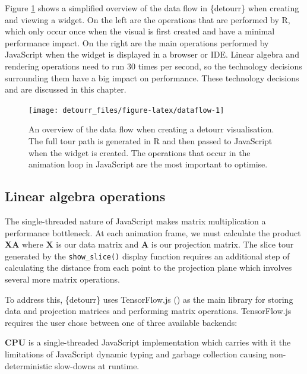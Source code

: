 Figure \ref{fig:dataflow} shows a simplified overview of the data flow
in \{detourr\} when creating and viewing a widget. On the left are the
operations that are performed by R, which only occur once when the
visual is first created and have a minimal performance impact. On the
right are the main operations performed by JavaScript when the widget is
displayed in a browser or IDE. Linear algebra and rendering operations
need to run 30 times per second, so the technology decisions surrounding
them have a big impact on performance. These technology decisions and
are discussed in this chapter.

\begin{Schunk}
\begin{figure}
\texttt{[image: detourr\_files/figure-latex/dataflow-1]} \caption[An overview of the data flow when creating a detourr visualisation]{An overview of the data flow when creating a detourr visualisation. The full tour path is generated in R and then passed to JavaScript when the widget is created. The operations that occur in the animation loop in JavaScript are the most important to optimise.}\label{fig:dataflow}
\end{figure}
\end{Schunk}

\hypertarget{linear-algebra-operations}{%
\subsection{Linear algebra operations}\label{linear-algebra-operations}}

The single-threaded nature of JavaScript makes matrix multiplication a
performance bottleneck. At each animation frame, we must calculate the
product \(\mathbf{XA}\) where \(\mathbf{X}\) is our data matrix and
\(\mathbf{A}\) is our projection matrix. The slice tour generated by the
\texttt{show\_slice()} display function requires an additional step of
calculating the distance from each point to the projection plane which
involves several more matrix operations.

To address this, \{detourr\} uses TensorFlow.js
(\citet{abadi2016tensorflow}) as the main library for storing data and
projection matrices and performing matrix operations. TensorFlow.js
requires the user chose between one of three available backends:

\textbf{CPU} is a single-threaded JavaScript implementation which
carries with it the limitations of JavaScript dynamic typing and garbage
collection causing non-deterministic slow-downs at runtime.

